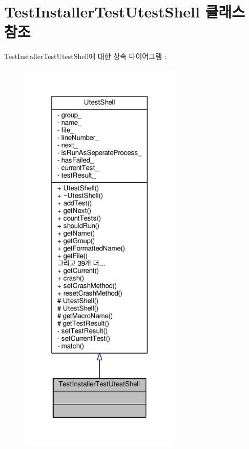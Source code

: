 \hypertarget{class_test_installer_test_utest_shell}{}\section{Test\+Installer\+Test\+Utest\+Shell 클래스 참조}
\label{class_test_installer_test_utest_shell}


Test\+Installer\+Test\+Utest\+Shell에 대한 상속 다이어그램 \+: 
\nopagebreak
\begin{figure}[H]
\begin{center}
\leavevmode
\includegraphics[height=550pt]{class_test_installer_test_utest_shell__inherit__graph}
\end{center}
\end{figure}



